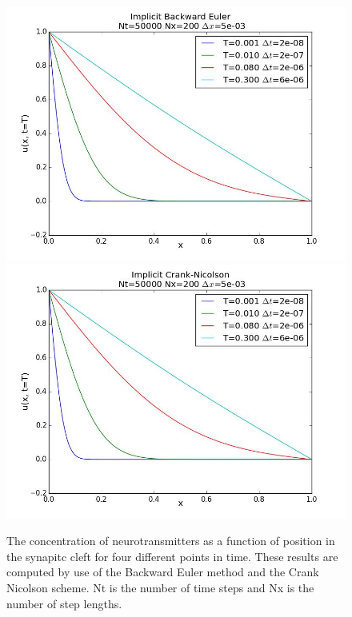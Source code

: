 \documentclass[12pt]{article}
\begin{document}
\begin{flushleft}
\begin{figure}[!h]
  \begin{minipage}{\linewidth}
    \centering
    {\includegraphics[scale=0.27]{EB_Nt5000_Nx200}}
     {\includegraphics[scale=0.27]{CN_Nt5000_Nx200}}
    \caption{The concentration of neurotransmitters as a function of position in the synapitc cleft for four different points in time. These results are computed by use of the Backward Euler method and the Crank Nicolson scheme. Nt is the number of time steps and Nx is the number of step lengths.}
  \end{minipage}
\end{figure}


\end{flushleft}
\end{document}
